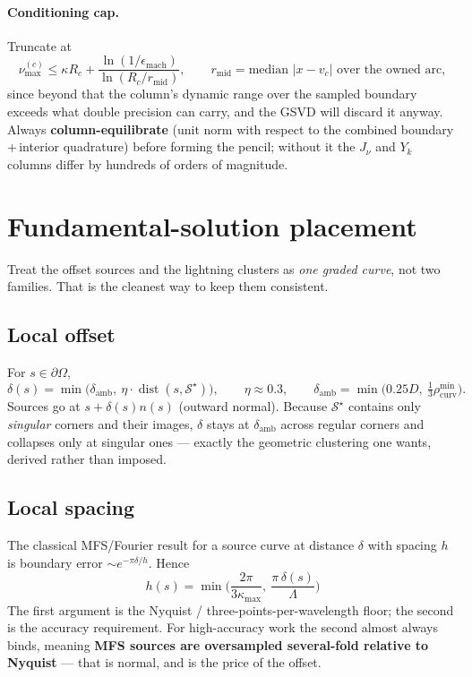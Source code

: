 \documentclass[11pt]{article}
\newcommand{\dist}{\operatorname{dist}}
\newcommand{\Sstar}{\mathcal{S}^\star}
\begin{document}
\paragraph{Conditioning cap.} Truncate at
\[
  \nu_{\max}^{(c)}\le \kappa R_c+\frac{\ln(1/\epsilon_{\mathrm{mach}})}{\ln(R_c/r_{\mathrm{mid}})},
  \qquad
  r_{\mathrm{mid}}=\text{median }|x-v_c|\text{ over the owned arc},
\]
since beyond that the column's dynamic range over the sampled boundary exceeds what
double precision can carry, and the GSVD will discard it anyway. Always
\textbf{column-equilibrate} (unit norm with respect to the combined
boundary\,+\,interior quadrature) before forming the pencil; without it the $J_\nu$
and $Y_k$ columns differ by hundreds of orders of magnitude.

\section{Fundamental-solution placement}
\label{sec:mfs}

Treat the offset sources and the lightning clusters as \emph{one graded curve}, not
two families. That is the cleanest way to keep them consistent.

\subsection{Local offset}

For $s\in\partial\Omega$,
\[
  \delta(s)=\min\Big(\delta_{\mathrm{amb}},\ \eta\cdot\dist(s,\Sstar)\Big),
  \qquad \eta\approx0.3,
  \qquad
  \delta_{\mathrm{amb}}=\min\big(0.25D,\ \tfrac{1}{3}\rho_{\mathrm{curv}}^{\min}\big).
\]
Sources go at $s+\delta(s)n(s)$ (outward normal). Because $\Sstar$ contains only
\emph{singular} corners and their images, $\delta$ stays at $\delta_{\mathrm{amb}}$
across regular corners and collapses only at singular ones --- exactly the geometric
clustering one wants, derived rather than imposed.

\subsection{Local spacing}

The classical MFS/Fourier result for a source curve at distance $\delta$ with spacing
$h$ is boundary error $\sim e^{-\pi\delta/h}$. Hence
\begin{equation}
  \boxed{\;
  h(s)=\min\Big(\frac{2\pi}{3\kappa_{\max}},\ \frac{\pi\,\delta(s)}{\Lambda}\Big)
  \;}
  \label{eq:h}
\end{equation}
The first argument is the Nyquist / three-points-per-wavelength floor; the second is
the accuracy requirement. For high-accuracy work the second almost always binds,
meaning \textbf{MFS sources are oversampled several-fold relative to Nyquist} --- that
is normal, and is the price of the offset.
\end{document}
